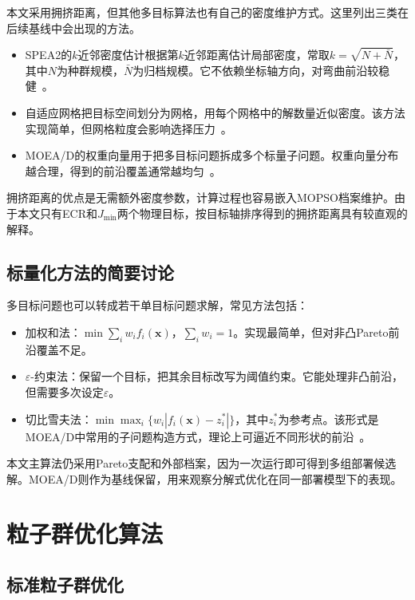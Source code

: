 本文采用拥挤距离，但其他多目标算法也有自己的密度维护方式。这里列出三类在后续基线中会出现的方法。

\begin{itemize}
    \item SPEA2的$k$近邻密度估计根据第$k$近邻距离估计局部密度，常取$k=\sqrt{N+\bar{N}}$，其中$N$为种群规模，$\bar{N}$为归档规模。它不依赖坐标轴方向，对弯曲前沿较稳健~\cite{Zitzler2001}。
    \item 自适应网格把目标空间划分为网格，用每个网格中的解数量近似密度。该方法实现简单，但网格粒度会影响选择压力~\cite{Knowles2000}。
    \item MOEA/D的权重向量用于把多目标问题拆成多个标量子问题。权重向量分布越合理，得到的前沿覆盖通常越均匀~\cite{Zhang2007}。
\end{itemize}

拥挤距离的优点是无需额外密度参数，计算过程也容易嵌入MOPSO档案维护。由于本文只有ECR和$J_{\min}$两个物理目标，按目标轴排序得到的拥挤距离具有较直观的解释。

\subsection{标量化方法的简要讨论}

多目标问题也可以转成若干单目标问题求解，常见方法包括：

\begin{itemize}
    \item 加权和法：$\min \sum_i w_i f_i(\mathbf{x})$，$\sum_i w_i = 1$。实现最简单，但对非凸Pareto前沿覆盖不足。
    \item $\varepsilon$-约束法：保留一个目标，把其余目标改写为阈值约束。它能处理非凸前沿，但需要多次设定$\varepsilon$。
    \item 切比雪夫法：$\min \max_i \{w_i |f_i(\mathbf{x}) - z_i^*|\}$，其中$z_i^*$为参考点。该形式是MOEA/D中常用的子问题构造方式，理论上可逼近不同形状的前沿~\cite{Zhang2007}。
\end{itemize}

本文主算法仍采用Pareto支配和外部档案，因为一次运行即可得到多组部署候选解。MOEA/D则作为基线保留，用来观察分解式优化在同一部署模型下的表现。

\section{粒子群优化算法}

\subsection{标准粒子群优化}


